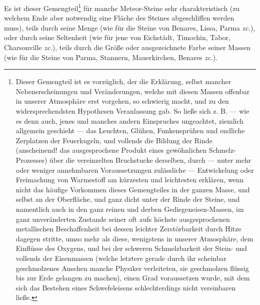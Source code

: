 \documentclass[a4paper, 11pt, oneside, german]{article}
\begin{document}
Es ist dieser Gemengteil\footnote{Dieser Gemengteil ist es vorzüglich, der die Erklärung, selbst mancher Nebenerscheinungen und Veränderungen, welche mit diesen Massen offenbar in unserer Atmosphäre erst vorgehen, so schwierig macht, und zu den widersprechendsten Hypothesen Veranlassung gab. So ließe sich z. B. --- wie es denn auch, jenes und manches andern Einspruches ungeachtet, ziemlich allgemein geschieht --- das Leuchten, Glühen, Funkensprühen und endliche Zerplatzen der Feuerkugeln, und vollends die Bildung der Rinde (anscheinend! das ausgesprochene Produkt eines gewöhnlichen Schmelz-Prozesses) über die vereinzelten Bruchstucke derselben, durch --- unter mehr oder weniger annehmbaren Voraussetzungen zulässliche --- Entwickelung oder Freimachung von Warmestoff am kürzesten und leichtesten erklären, wenn nicht das häufige Vorkommen dieses Gemengteiles in der ganzen Masse, und selbst an der Oberfläche, und ganz dicht unter der Rinde der Steine, und namentlich auch in den ganz reinen und derben Gediegeneisen-Massen, im ganz unveränderten Zustande seiner oft aufs höchste ausgesprochenen metallischen Beschaffenheit bei dessen leichter Zerstörbarkeit durch Hitze dagegen stritte, umso mehr als diese, wenigstens in unserer Atmosphäre, dem Einflüsse des Oxygens, und bei der schweren Schmelzbarkeit der Stein- und vollends der Eisenmassen (welche letztere gerade durch ihr scheinbar geschmolzenes Ansehen manche Physiker verleiteten, sie geschmolzen flüssig bis zur Erde gelangen zu machen), einen Grad voraussetzen wurde, mit dem sich das Bestehen eines Schwefeleisens schlechterdings nicht vereinbaren ließe.} für manche Meteor-Steine sehr charakteristisch (zu welchem Ende aber notwendig eine Fläche des Steines abgeschliffen werden muss), teils durch seine Menge (wie für die Steine von Benares, Lissa, Parma \emph{zc.}), oder durch seine Seltenheit (wie für jene von Eichstädt, Timochin, Tabor, Charsonville \emph{zc.}), teils durch die Größe oder ausgezeichnete Farbe seiner Massen (wie für die Steine von Parma, Stannern, Mauerkirchen, Benares \emph{zc.}).
\end{document}
